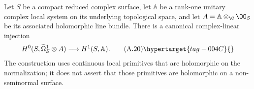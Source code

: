 
\begin{proposition}\hypertarget{tag-01AW}{}\label{cdp:st:A.4.7}


Let $S$ be a compact reduced complex surface, let $\mathbb A$ be a rank-one unitary complex local system on its underlying topological space, and let $A=\mathbb A\otimes_{\C}\OO_S$ be its associated holomorphic line bundle. There is a canonical complex-linear injection
\[
 H^0(S,\widetilde\Omega_S^1\otimes A)
       \longrightarrow H^1(S,\mathbb A).
 \tag{A.20}\hypertarget{tag-004C}{}\label{cdp:eq:A.20}
\]
The construction uses continuous local primitives that are holomorphic on the normalization; it does not assert that those primitives are holomorphic on a non-seminormal surface.
\end{proposition}

